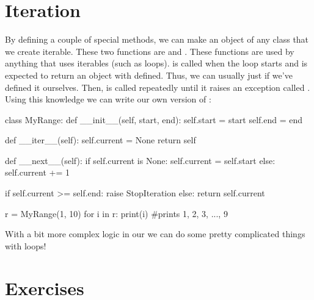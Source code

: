 \documentclass[11pt]{cselabheader}
\begin{document}
\section{Iteration}
\label{sec:iter}
By defining a couple of special methods, we can make an object of any class that
we create iterable. These two functions are  and
. These functions are used by anything that uses
iterables (such as  loops).  is called
when the loop starts and is expected to return an object with
 defined. Thus, we can usually just
 if we've defined it ourselves. Then,
 is called repeatedly until it raises an exception called
. Using this knowledge we can write our own version
of :

\begin{python3code}
class MyRange:
    def __init__(self, start, end):
        self.start = start
        self.end = end

    def __iter__(self):
        self.current = None
        return self

    def __next__(self):
        if self.current is None:
            self.current = self.start
        else:
            self.current += 1

        if self.current >= self.end:
            raise StopIteration
        else:
            return self.current

r = MyRange(1, 10)
for i in r:
    print(i) #prints 1, 2, 3, ..., 9
\end{python3code}

With a bit more complex logic in our  we can do some
pretty complicated things with  loops!

\clearpage
\section{Exercises}
\label{sec:ex}
\end{document}
